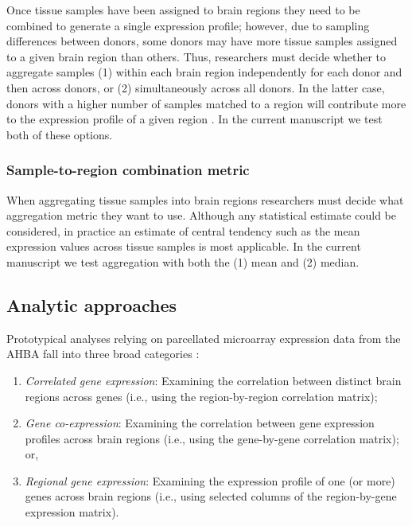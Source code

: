 \documentclass[12pt,aps,pra,reprint,showkeys]{revtex4-1}
\begin{document}
Once tissue samples have been assigned to brain regions they need to be combined to generate a single expression profile; however, due to sampling differences between donors, some donors may have more tissue samples assigned to a given brain region than others.
Thus, researchers must decide whether to aggregate samples (1) within each brain region independently for each donor and then across donors, or (2) simultaneously across all donors.
In the latter case, donors with a higher number of samples matched to a region will contribute more to the expression profile of a given region \citep{arnatkeviciute2019neuroimage}.
In the current manuscript we test both of these options.

\subsubsection*{Sample-to-region combination metric}

When aggregating tissue samples into brain regions researchers must decide what aggregation metric they want to use.
Although any statistical estimate could be considered, in practice an estimate of central tendency such as the mean expression values across tissue samples is most applicable.
In the current manuscript we test aggregation with both the (1) mean and (2) median.

\subsection*{Analytic approaches} \label{analytic-approaches}

Prototypical analyses relying on parcellated microarray expression data from the AHBA fall into three broad categories \citep{fornito2019tics}:

\begin{enumerate}
  \item \emph{Correlated gene expression}: Examining the correlation between distinct brain regions across genes (i.e., using the region-by-region correlation matrix);
  \item \emph{Gene co-expression}: Examining the correlation between gene expression profiles across brain regions (i.e., using the gene-by-gene correlation matrix); or,
  \item \emph{Regional gene expression}: Examining the expression profile of one (or more) genes across brain regions (i.e., using selected columns of the region-by-gene expression matrix).
\end{enumerate}
\end{document}
